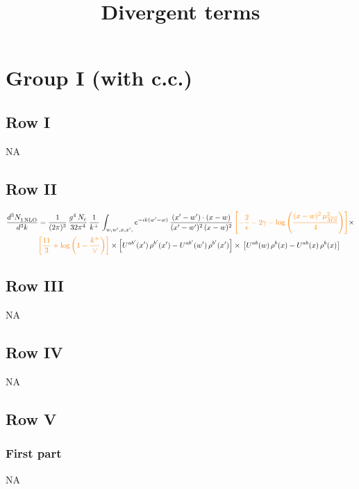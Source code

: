 \documentclass[9pt]{article}
\title{Divergent terms}
\author{}
\date{}
\numberwithin{equation}{section}
\begin{document}
\maketitle
\section{Group I (with c.c.)}
\subsection{Row I}
\textsc{NA}
\subsection{Row II}
\begin{align}
     \frac{d^{3}N_{1\,\rm NLO}^{\rm}}{d^{3}k} &  =  \frac{1}{(2\pi)^{3}}\, \frac{g^{4}\,N_{c}}{32\pi^{4}}\,\frac{1}{k^{+}}\, \int_{w, w',x,x',} e^{-ik(w^\prime-w)}\, \frac{(x'-w')\cdot (x-w)}{(x'-w')^{2}\, (x-w)^{2}}\, {\color{orange}\left[-\frac{2}{\epsilon}-2\gamma-\log{\left(\frac{(x-w)^{2}\,\mu^{2}_{\overline{MS}}}{4}\right)}\right]}\times \notag \\ & {\color{orange}\left[\frac{11}{3}+\log{\left(1-\frac{k^{+}}{\vee}\right)}\right]}\times \left[U^{ab'}(x')\,\rho^{b'}(x') - U^{ab'}(w')\,\rho^{b'}(x')\right]\times\,\left[U^{ab}(w)\,\rho^{b}(x) - U^{ab}(x)\,\rho^{b}(x)\right]
\end{align}
\subsection{Row III}
\textsc{NA}
\subsection{Row IV}
\textsc{NA}
\subsection{Row V}
\subsubsection*{First part}
\textsc{NA}
\end{document}
